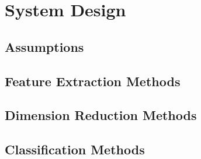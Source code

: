 \chapter{System Design}
\label{chap:design}

\section{Assumptions}


\section{Feature Extraction Methods}

\section{Dimension Reduction Methods}

\section{Classification Methods}



